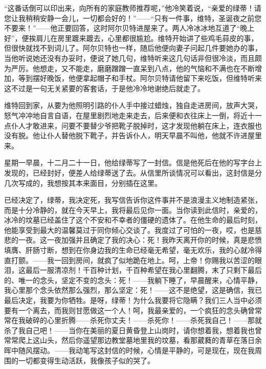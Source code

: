 \documentclass[12pt,oneside]{book}
\begin{document}
\begin{framed}
“这番话倒可以印出来，向所有的家庭教师推荐呢，”他冷笑着说，“亲爱的绿蒂！请您让我稍稍安静一会儿，一切都会好的！”——“只有一件事，维特，圣诞夜之前您不要来！”——他正要回答，这时阿尔贝特进屋来了。两人冷冰冰地互道了“晚上好”，便挨肩儿在房里踱来踱去，心里都很尴尬。维特开始讲了些鸡毛蒜皮的事，但很快就找不到词儿了。阿尔贝特也一样，随后他便向妻子问起几件要她办的事，当他听说她还没有办妥时，便说了她几句，维特听来这几句话非但很冷淡，而且颇为严厉。他想走，又不能走，磨磨蹭蹭一直呆到八点，他的气恼和不满也在不断增加，等到摆好晚饭，他便拿起帽子和手杖。阿尔贝特请他留下来吃饭，但维特听来这不过是一句无关紧要的客套话，于是他冷冷地谢绝后就走了。

维特回到家，从要为他照明引路的仆人手中接过蜡烛，独自走进房间，放声大哭，怒气冲冲地自言自语，在屋里剧烈地走来走去，后来便和衣往床上一倒，将近十一点仆人才敢进来，问要不要替少爷把靴子脱掉时，这才发现他躺在床上，连衣服也没有脱。他让仆人替他脱下靴子，并告诉仆人，明天早晨不叫他，他就不许进屋里来。

星期一早晨，十二月二十一日，他给绿蒂写了一封信。信是他死后在他的写字台上发现的，已经封好，便差人给绿蒂送了去。从信里所谈情况可以看出，这封信是分几次写成的，我想按其本来面目，分别插在这里。
\end{framed}

已经决定了，绿蒂，我决定死，我写信告诉你这件事并不是浪漫主义地制造紧张，而是十分冷静的，就在今天早上，我将最后见你一面。当你读到此信时，亲爱的，冰冷的坟墓已经盖住了这个不安和不幸者的僵硬的遗体了。在他生命的最后时刻，他能享受到最大的温馨莫过于同你倾心交谈了。我度过了可怕的一夜，哎，也是慈悲的一夜。这一夜加强并且确定了我的决心：死！我昨天离开你的时候，真是悲愤填膺、肝肠寸断，想到在你身边我的生命已经毫无希望，毫无欢乐，我的心就冷得直打颤。——我一回到房间，就疯了似地跪在地上。呵，上帝！你赐我以苦涩的眼泪，这最后一服清凉剂！千百种计划，千百种希望在我心里翻腾，末了只剩下最后的、唯一的念头，坚定不变的念头：死！——我躺下睡了，早晨醒来，心情平静，我心里那个念头依然那么强烈，那么坚定：死！——这不是绝望，这是确信，我已最后决定，我要为你牺牲。是呀，绿蒂！为什么我要将它隐瞒？我们三人当中必须要有一个离去，而我则甘愿做这一个人！呵，我最亲爱的，一个疯狂的念头确曾常常在我破碎的心里折腾——杀死你丈夫！——杀死你！——杀死我自己！——那就杀了我自己吧！——当你在美丽的夏日黄昏登上山岗时，请你想着我，想着我也曾常常爬上这山头，然后你遥望那边教堂墓地里我的坟墓，看那葳蕤的青草在落日余晖中随风摆动。——我动笔写这封信的时候，心情是平静的，可是现在，现在我周围的一切都变得生动活跃，我像孩子似的哭了。
\end{document}
